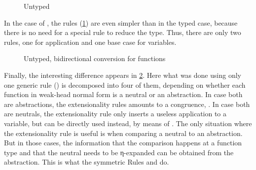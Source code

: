 \begin{figure}[h]
  \ContinuedFloat
  \caption{Untyped }
  \label{fig:neu-ucomp}
\end{figure}

\AP {}
In the case of , the rules (\cref{fig:neu-ucomp}) are even simpler
than in the typed case, because there is no need for a special rule to reduce the type.
Thus, there are only two rules, one for application and one base case for variables.

\begin{figure}[h]
  \ContinuedFloat
  \caption{Untyped, bidirectional conversion for functions}
  \label{fig:bd-uconv-fun}
\end{figure}

Finally, the interesting difference appears in \cref{fig:bd-uconv-fun}. Here what was done
using only one generic rule () is decomposed into four of them,
depending on whether each function in weak-head normal form is a neutral or an abstraction.
In case both are abstractions, the extensionality rules amounts to a congruence, \ie
{}.%
In case both are neutrals, the extensionality rule only inserts
a useless application to a variable, but  can be directly used
instead, by means of .
The only situation where the extensionality rule is useful is when comparing a neutral
to an abstraction. But in those cases, the information that the comparison happens at a function
type and that the neutral needs to be η-expanded can be obtained from the abstraction.
This is what the symmetric Rules  and  do.

